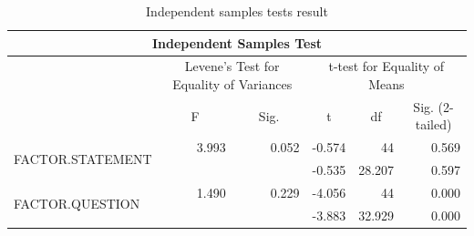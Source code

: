 \documentclass[a4paper]{article}
\begin{document}
\begin{table}[H]
\centering
\caption{Independent samples tests result}
\label{tab:stats-intonation-t}
\begin{tabular}{|l|c|c|r|r|r|} 
\hline
\multicolumn{6}{|c|}{Independent Samples Test}                                                                                                                                                                                                 \\ 
\hline
                                  & \multicolumn{2}{c|}{Levene's Test for Equality of Variances} & \multicolumn{3}{c|}{t-test for Equality of Means}                                                                                           \\ 
\hline
                                  & \multirow{2}{*}{F}         & \multirow{2}{*}{Sig.}           & \multicolumn{1}{c|}{\multirow{2}{*}{t}} & \multicolumn{1}{c|}{\multirow{2}{*}{df}} & \multicolumn{1}{c|}{\multirow{2}{*}{Sig. (2-tailed)}}  \\ 
\cline{1-1}
                                  &                            &                                 & \multicolumn{1}{c|}{}                   & \multicolumn{1}{c|}{}                    & \multicolumn{1}{c|}{}                                  \\ 
\hline
\multirow{2}{*}{FACTOR.STATEMENT} & \multicolumn{1}{r|}{3.993} & \multicolumn{1}{r|}{0.052}      & -0.574                                  & 44                                       & 0.569                                                  \\ 
\cline{2-6}
                                  & \multicolumn{1}{l|}{~}     & \multicolumn{1}{l|}{~}          & -0.535                                  & 28.207                                   & 0.597                                                  \\ 
\hline
\multirow{2}{*}{FACTOR.QUESTION}  & \multicolumn{1}{r|}{1.490} & \multicolumn{1}{r|}{0.229}      & -4.056                                  & 44                                       & 0.000                                                  \\ 
\cline{2-6}
                                  & \multicolumn{1}{l|}{~}     & \multicolumn{1}{l|}{~}          & -3.883                                  & 32.929                                   & 0.000                                                  \\
\hline
\end{tabular}
\end{table}
\end{document}
